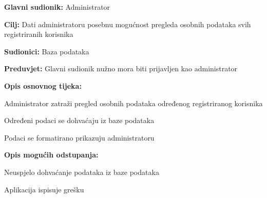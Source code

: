     				\noindent {}
    				\begin{packed_item}
    					
    					\item \textbf{Glavni sudionik:} Administrator
    					\item  \textbf{Cilj:} Dati administratoru posebnu mogućnost pregleda osobnih podataka svih registriranih korisnika
    					\item  \textbf{Sudionici:} Baza podataka
    					\item  \textbf{Preduvjet:} Glavni sudionik nužno mora biti prijavljen kao administrator
    					\item  \textbf{Opis osnovnog tijeka:}
    					
    					\item[] \begin{packed_enum}
    						
    						\item Administrator zatraži pregled osobnih podataka određenog registriranog korisnika
    						\item Određeni podaci se dohvaćaju iz baze podataka
    						\item Podaci se formatirano prikazuju administratoru
    					\end{packed_enum}
    					
    					\item  \textbf{Opis mogućih odstupanja:}
    					
    					\item[] \begin{packed_item}
    						
    						\item[2.a] Neuspjelo dohvaćanje podataka iz baze podataka
    						\item[] \begin{packed_enum}
    							
    							\item Aplikacija ispisuje grešku
    							
    						\end{packed_enum}
    						
    					\end{packed_item}
    				\end{packed_item}
    				\noindent {}
